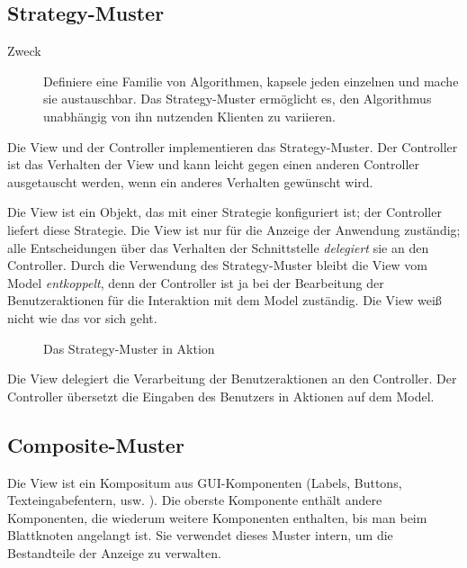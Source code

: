\documentclass[11pt,a4paper,titlepage]{scrreprt}
\begin{document}
\subsection{Strategy-Muster}
\begin{description}
\item[Zweck]
Definiere eine Familie von Algorithmen, kapsele jeden einzelnen und mache sie austauschbar.
Das Strategy-Muster ermöglicht es, den Algorithmus unabhängig von ihn nutzenden Klienten
zu variieren. \citep[S. 373]{Riehle200407}

\end{description}

Die View und der Controller implementieren das Strategy-Muster. Der Controller ist das
Verhalten der View und kann leicht gegen einen anderen Controller ausgetauscht werden,
wenn ein anderes Verhalten gewünscht wird.

Die View ist ein Objekt, das mit einer Strategie konfiguriert ist; der Controller
liefert diese Strategie. Die View ist nur für die Anzeige der Anwendung zuständig;
alle Entscheidungen über das Verhalten der Schnittstelle {\itshape delegiert} sie an
den Controller. Durch die Verwendung des Strategy-Muster bleibt die View vom
Model {\itshape entkoppelt}, denn der Controller ist ja bei der Bearbeitung der
Benutzeraktionen für die Interaktion mit dem Model zuständig. Die View weiß nicht
wie das vor sich geht.

\begin{figure}[h]
\caption{Das Strategy-Muster in Aktion}
\end{figure}

Die View delegiert die Verarbeitung der Benutzeraktionen an den Controller. Der Controller
übersetzt die Eingaben des Benutzers in Aktionen auf dem Model.

\subsection{Composite-Muster}
Die View ist ein Kompositum aus GUI-Komponenten (Labels, Buttons, Texteingabefentern, usw. ).
Die oberste Komponente enthält andere Komponenten, die wiederum weitere Komponenten enthalten,
bis man beim Blattknoten angelangt ist. Sie verwendet dieses Muster intern, um die Bestandteile
der Anzeige zu verwalten.
\end{document}
